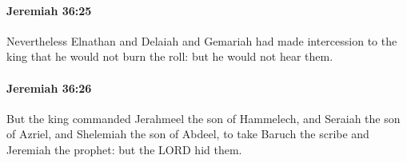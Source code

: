 		\paragraph{Jeremiah 36:25} %
			\label{JEREMIAH-36-25}

			Nevertheless Elnathan and Delaiah and Gemariah had made intercession to the king that he would not burn the roll: but he would not hear them.


		\paragraph{Jeremiah 36:26} %
			\label{JEREMIAH-36-26}

			But the king commanded Jerahmeel the son of Hammelech, and Seraiah the son of Azriel, and Shelemiah the son of Abdeel, to take Baruch the scribe and Jeremiah the prophet: but the LORD hid them.


